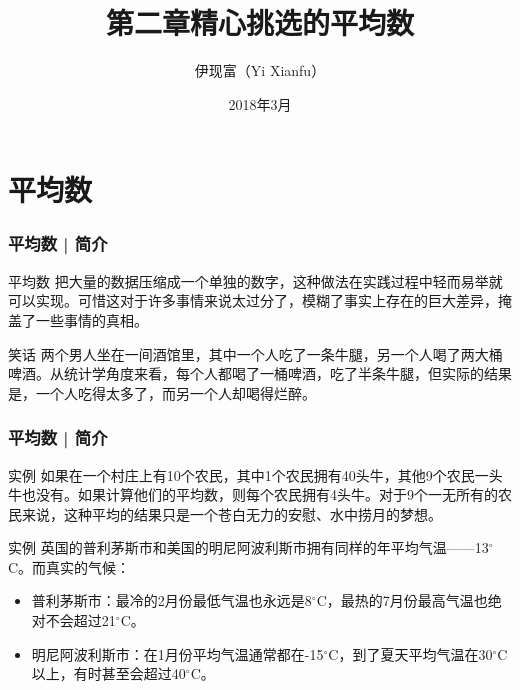 



\title[平均数]{第二章\quad 精心挑选的平均数}
\author[Yixf]{伊现富（Yi Xianfu）}
\date{2018年3月}



\section{平均数}
\begin{frame}
  \frametitle{平均数 | 简介}
  \begin{block}{平均数}
把大量的数据压缩成一个单独的数字，这种做法在实践过程中轻而易举就可以实现。可惜这对于许多事情来说太过分了，模糊了事实上存在的巨大差异，掩盖了一些事情的真相。
  \end{block}
  \pause
  \begin{block}{笑话}
两个男人坐在一间酒馆里，其中一个人吃了一条牛腿，另一个人喝了两大桶啤酒。从统计学角度来看，每个人都喝了一桶啤酒，吃了半条牛腿，但实际的结果是，一个人吃得太多了，而另一个人却喝得烂醉。
  \end{block}
\end{frame}

\begin{frame}
  \frametitle{平均数 | 简介}
  \begin{block}{实例}
如果在一个村庄上有10个农民，其中1个农民拥有40头牛，其他9个农民一头牛也没有。如果计算他们的平均数，则每个农民拥有4头牛。对于9个一无所有的农民来说，这种平均的结果只是一个苍白无力的安慰、水中捞月的梦想。
  \end{block}
  \pause
  \begin{block}{实例}
    英国的普利茅斯市和美国的明尼阿波利斯市拥有同样的年平均气温——13$^{\circ}$C。而真实的气候：
    \pause
    \begin{itemize}
      \item 普利茅斯市：最冷的2月份最低气温也永远是8$^{\circ}$C，最热的7月份最高气温也绝对不会超过21$^{\circ}$C。
      \item 明尼阿波利斯市：在1月份平均气温通常都在-15$^{\circ}$C，到了夏天平均气温在30$^{\circ}$C以上，有时甚至会超过40$^{\circ}$C。
    \end{itemize}
  \end{block}
\end{frame}

